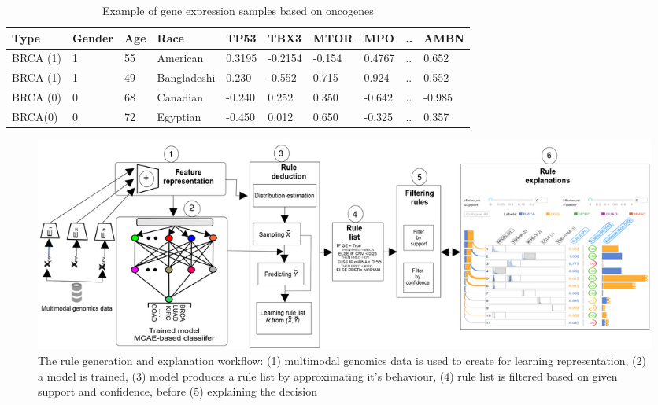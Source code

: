 \begin{table}[h!]
    \caption{Example of gene expression samples based on oncogenes}
    \label{ge:ancor_example}
    \vspace{-6mm}
    \begin{center}
        \scriptsize
        \begin{tabular}{l|l|l|l|l|l|l|l|l|l}
            \hline
            \rowcolor{Gray}
            \textbf{Type} & \textbf{Gender} & \textbf{Age} & \textbf{Race} & \textbf{TP53} & \textbf{TBX3} & \textbf{MTOR} & \textbf{MPO}  & .. & \textbf{AMBN} \\\hline    
            BRCA (1) & 1 & 55 & American & 0.3195 & -0.2154 & -0.154 & 0.4767  & .. & 0.652 \\\hline
            BRCA (1) & 1 & 49 & Bangladeshi & 0.230 &  -0.552  & 0.715  & 0.924   & .. & 0.552 \\\hline
            BRCA (0) & 0 & 68 & Canadian & -0.240 &  0.252  & 0.350  & -0.642  & .. & -0.985 \\\hline
            BRCA(0) & 0 & 72 & Egyptian & -0.450 &  0.012  & 0.650  & -0.325  & .. & 0.357 \\\hline
        \end{tabular}
        \vspace{-4mm}
    \end{center}
\end{table}


\begin{figure}
	\centering
		\includegraphics[scale=0.75]{images/rules_wf.png}
	    \caption[The rule generation and explanation workflow]{The rule generation and explanation workflow: (1) multimodal genomics data is used to create for learning representation, (2) a model is trained, (3) model produces a rule list by approximating it's behaviour, (4) rule list is filtered based on given support and confidence, before (5) explaining the decision} 
	    \label{fig:rules_wf}
\end{figure}

